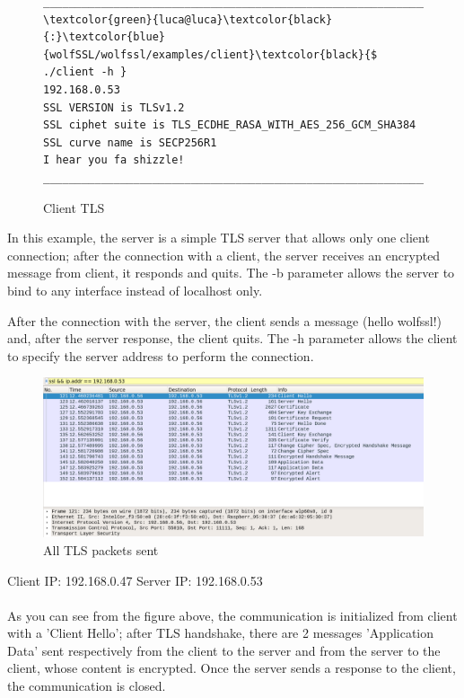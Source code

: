 \documentclass[a4paper,12pt]{article}
\begin{document}
\begin{figure}[H]
\begin{Verbatim}[commandchars=\\\{\}]
______________________________________________________________
\textcolor{green}{luca@luca}\textcolor{black}{:}\textcolor{blue}{wolfSSL/wolfssl/examples/client}\textcolor{black}{$ ./client -h }
192.168.0.53
SSL VERSION is TLSv1.2
SSL ciphet suite is TLS_ECDHE_RASA_WITH_AES_256_GCM_SHA384
SSL curve name is SECP256R1
I hear you fa shizzle!
______________________________________________________________
\end{Verbatim}
\caption{Client TLS}
\end{figure}


In this example, the server is a simple TLS server that allows only one client connection; after the connection with a client, the server receives an encrypted message from client, it responds and quits.
The -b parameter allows the server to bind to any interface instead of localhost only.

After the connection with the server, the client sends a message (hello wolfssl!) and, after the server response, the client quits.
The -h parameter allows the client to specify the server address to perform the connection.

\begin{figure}[H]
    \centering
    \includegraphics[scale=0.22]{test/examples/client-server/wireshark1.png}
    \caption{All TLS packets sent}
    
\end{figure}
Client IP:  192.168.0.47 \hspace{4cm} Server IP: 192.168.0.53\\ \\
As you can see from the figure above, the communication is initialized from client with a 'Client Hello'; after TLS handshake, there are 2 messages 'Application Data' sent respectively from the client to the server and from the server to the client, whose content is encrypted. Once the server sends a response to the client, the communication is closed.
\end{document}
